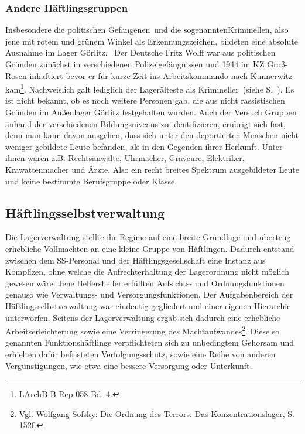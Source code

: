 \subsubsection{Andere Häftlingsgruppen}%
Insbesondere die \glqq politischen Gefangenen\grqq~und die sogenannten\glqq Kriminellen\grqq, also jene mit rotem und grünem Winkel als Erkennungszeichen, bildeten eine absolute Ausnahme im Lager Görlitz.~\newline
Der Deutsche Fritz Wolff war aus politischen Gründen zunächst in verschiedenen Polizeigefängnissen und 1944 im KZ Groß-Rosen inhaftiert bevor er für kurze Zeit ins Arbeitskommando nach Kunnerwitz kam\footnote{LArchB B Rep 058 Bd. 4.}. Nachweislich galt lediglich der Lagerälteste als \glqq Krimineller\grqq~(siehe S.~\pageref{czech}). Es ist nicht bekannt, ob es noch weitere Personen gab, die aus nicht rassistischen Gründen im Außenlager Görlitz festgehalten wurden.
\newline
Auch der Versuch Gruppen anhand der verschiedenen Bildungsniveaus zu identifizieren, erübrigt sich fast, denn man kann davon ausgehen, dass sich unter den deportierten Menschen nicht weniger gebildete Leute befanden, als in den Gegenden ihrer Herkunft. Unter ihnen waren z.B. Rechtsanwälte, Uhrmacher, Graveure, Elektriker, Krawattenmacher und Ärzte. Also ein recht breites Spektrum ausgebildeter Leute und keine bestimmte Berufsgruppe oder Klasse.

\subsection{Häftlingsselbstverwaltung}
Die Lagerverwaltung stellte ihr Regime auf eine breite Grundlage und übertrug erhebliche Vollmachten an eine kleine Gruppe von Häftlingen. Dadurch entstand zwischen dem SS-Personal und der Häftlingsgesellschaft eine Instanz aus Komplizen, ohne welche die Aufrechterhaltung der Lagerordnung nicht möglich gewesen wäre. Jene Helfershelfer erfüllten Aufsichts- und Ordnungsfunktionen genauso wie Verwaltungs- und Versorgungsfunktionen. Der Aufgabenbereich der Häftlingsselbstverwaltung war eindeutig gegliedert und einer eigenen Hierarchie unterworfen. Seitens der Lagerverwaltung ergab sich dadurch eine erhebliche Arbeitserleichterung sowie eine Verringerung des Machtaufwandes\footnote{Vgl. Wolfgang Sofsky: Die Ordnung des Terrors. Das Konzentrationslager, S. 152f.}. Diese so genannten Funktionshäftlinge verpflichteten sich zu unbedingtem Gehorsam und erhielten dafür befristeten Verfolgungsschutz, sowie eine Reihe von anderen Vergünstigungen, wie etwa eine bessere Versorgung oder Unterkunft.

